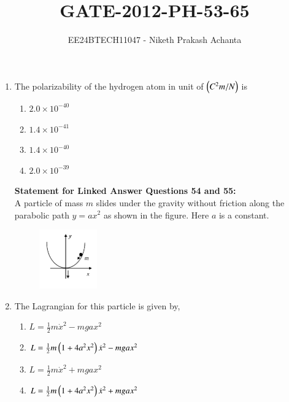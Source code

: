 \documentclass[journal]{IEEEtran}
\renewcommand{\thefigure}{\theenumi}
\renewcommand{\thetable}{\theenumi}
\numberwithin{equation}{enumi}
\numberwithin{figure}{enumi}
\renewcommand{\thetable}{\theenumi}
\begin{document}

\vspace{3cm}

\title{GATE-2012-PH-53-65}
\author{EE24BTECH11047 - Niketh Prakash Achanta}
{\let\newpage\relax\maketitle}
\renewcommand{\thefigure}{\theenumi}
\renewcommand{\thetable}{\theenumi}
\begin{enumerate}[start=53]
	\item The polarizability of the hydrogen atom in unit of $\left(C^2m/N\right)$ is
    \begin{enumerate}
        \item $2.0 \times 10^{-40}$
        \item $1.4 \times 10^{-41}$
        \item $1.4 \times 10^{-40}$
        \item $2.0 \times 10^{-39}$
    \end{enumerate}

\textbf{Statement for Linked Answer Questions 54 and 55:}\\ 
 A particle of mass $m$ slides under the gravity without friction along the parabolic path $y = ax^2$ as shown in the figure. Here $a$ is a constant.\\
     \begin{figure}[!ht]
    \centering
    \includegraphics[width=2.5cm]{figs/fig1.png}
    \end{figure}
\item The Lagrangian for this particle is given by,
    \begin{enumerate}
        \item $L = \frac{1}{2} m\dot{x}^2 - mgax^2$
	\item $L = \frac{1}{2} m\left(1 + 4a^2x^2\right)\dot{x}^2 - mgax^2$
        \item $L = \frac{1}{2} m\dot{x}^2 + mgax^2$
	\item $L = \frac{1}{2} m\left(1 + 4a^2x^2\right)\dot{x}^2 + mgax^2$
    \end{enumerate}


\end{enumerate}
\end{document}
